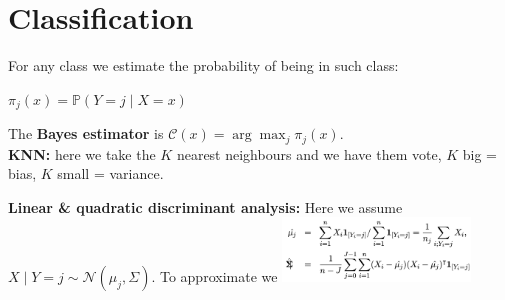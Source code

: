 \section{Classification}
For any class we estimate the probability of being in such class:

    $\pi_j(x) = \mathbb{P}(Y = j\mid X=x)$

The \textbf{Bayes estimator} is $\mathcal{C}(x) = \arg\max_j\pi_j(x)$.\\
\textbf{KNN:} here we take the $K$ nearest neighbours and we have them vote, $K$ big = bias, $K$ small = variance.
\textbf{Linear \& quadratic discriminant analysis:} 
Here we assume $X\mid Y = j \sim {}(\mu_j,\Sigma)$. To approximate we \includegraphics[width = 5cm]{LDA.png}\\


